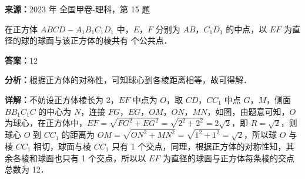 \begin{question}[points=5]
\textbf{来源：}2023 年 全国甲卷-理科，第 15 题\par
在正方体 $ABCD-A_1B_1C_1D_1$ 中，$E$，$F$ 分别为 $AB$，$C_1D_1$ 的中点，以 $EF$ 为直径的球的球面与该正方体的棱共有  个公共点．
\fillin[{$12$}]
\begin{solution}
\textbf{答案：}$12$

\textbf{分析：}根据正方体的对称性，可知球心到各棱距离相等，故可得解．

\textbf{详解：}不妨设正方体棱长为 2，$EF$ 中点为 $O$，取 $CD$，$CC_1$ 中点 $G$，$M$，侧面 $BB_1C_1C$ 的中心为 $N$，连接 $FG$，$EG$，$OM$，$ON$，$MN$，如图，由题意可知，$O$ 为球心，在正方体中，$EF = \sqrt{FG^2+EG^2} = \sqrt{2^2+2^2} = 2\sqrt{2}$，即 $R=\sqrt{2}$，则球心 $O$ 到 $CC_1$ 的距离为 $OM = \sqrt{ON^2+MN^2} = \sqrt{1^2+1^2} = \sqrt{2}$，所以球 $O$ 与棱 $CC_1$ 相切，球面与棱 $CC_1$ 只有 1 个交点，同理，根据正方体的对称性知，其余各棱和球面也只有 1 个交点，所以以 $EF$ 为直径的球面与正方体每条棱的交点总数为 12．
\end{solution}
\end{question}

